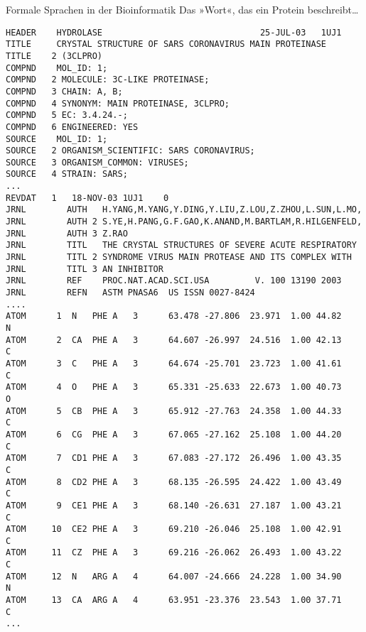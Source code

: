 \begin{frame}[fragile]{Formale Sprachen in der Bioinformatik}
  {Das »Wort«, das ein Protein beschreibt\dots}
\begin{verbatim}
HEADER    HYDROLASE                               25-JUL-03   1UJ1              
TITLE     CRYSTAL STRUCTURE OF SARS CORONAVIRUS MAIN PROTEINASE                 
TITLE    2 (3CLPRO)
COMPND    MOL_ID: 1;                                                            
COMPND   2 MOLECULE: 3C-LIKE PROTEINASE;                                        
COMPND   3 CHAIN: A, B;                                                         
COMPND   4 SYNONYM: MAIN PROTEINASE, 3CLPRO;                                    
COMPND   5 EC: 3.4.24.-;                                                        
COMPND   6 ENGINEERED: YES                                                      
SOURCE    MOL_ID: 1;                                                            
SOURCE   2 ORGANISM_SCIENTIFIC: SARS CORONAVIRUS;                               
SOURCE   3 ORGANISM_COMMON: VIRUSES;                                            
SOURCE   4 STRAIN: SARS;                                                        
...
REVDAT   1   18-NOV-03 1UJ1    0                                                
JRNL        AUTH   H.YANG,M.YANG,Y.DING,Y.LIU,Z.LOU,Z.ZHOU,L.SUN,L.MO,          
JRNL        AUTH 2 S.YE,H.PANG,G.F.GAO,K.ANAND,M.BARTLAM,R.HILGENFELD,          
JRNL        AUTH 3 Z.RAO                                                        
JRNL        TITL   THE CRYSTAL STRUCTURES OF SEVERE ACUTE RESPIRATORY           
JRNL        TITL 2 SYNDROME VIRUS MAIN PROTEASE AND ITS COMPLEX WITH            
JRNL        TITL 3 AN INHIBITOR                                                 
JRNL        REF    PROC.NAT.ACAD.SCI.USA         V. 100 13190 2003              
JRNL        REFN   ASTM PNASA6  US ISSN 0027-8424                               
....
ATOM      1  N   PHE A   3      63.478 -27.806  23.971  1.00 44.82           N  
ATOM      2  CA  PHE A   3      64.607 -26.997  24.516  1.00 42.13           C  
ATOM      3  C   PHE A   3      64.674 -25.701  23.723  1.00 41.61           C  
ATOM      4  O   PHE A   3      65.331 -25.633  22.673  1.00 40.73           O  
ATOM      5  CB  PHE A   3      65.912 -27.763  24.358  1.00 44.33           C  
ATOM      6  CG  PHE A   3      67.065 -27.162  25.108  1.00 44.20           C  
ATOM      7  CD1 PHE A   3      67.083 -27.172  26.496  1.00 43.35           C  
ATOM      8  CD2 PHE A   3      68.135 -26.595  24.422  1.00 43.49           C  
ATOM      9  CE1 PHE A   3      68.140 -26.631  27.187  1.00 43.21           C  
ATOM     10  CE2 PHE A   3      69.210 -26.046  25.108  1.00 42.91           C  
ATOM     11  CZ  PHE A   3      69.216 -26.062  26.493  1.00 43.22           C  
ATOM     12  N   ARG A   4      64.007 -24.666  24.228  1.00 34.90           N  
ATOM     13  CA  ARG A   4      63.951 -23.376  23.543  1.00 37.71           C  
...
\end{verbatim}
\end{frame}

